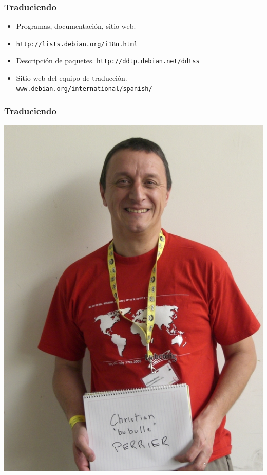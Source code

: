 \documentclass{beamer}
\begin{document}
\begin{frame}
\frametitle{Traduciendo}
        \begin{itemize}
                \pause \item Programas, documentaci\'on, sitio web.  \item \texttt{http://lists.debian.org/i18n.html}
		\pause \item Descripci\'on de paquetes. \texttt{http://ddtp.debian.net/ddtss}
		\pause \item Sitio web del equipo de traducci\'on. \texttt{www.debian.org/international/spanish/}
        \end{itemize}

\end{frame}

\begin{frame}
\frametitle{Traduciendo}
        \begin{center}
                 \includegraphics[scale=0.20]{../img/bubulle.jpg}
        \end{center}

\end{frame}
\end{document}

